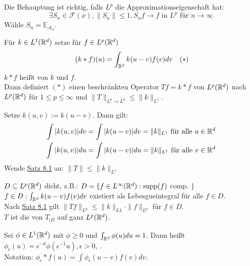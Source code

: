 \begin{beweis}
	Die Behauptung ist richtig, falls $L^{p}$ die Approximationseigenschaft hat:
	\[ \exists S_{n} \in \mathcal{F}(x), \| S_{n} \| \leq 1, S_{n} f \rightarrow f \text{ in } L^{p} \text{ für } n \rightarrow \infty \]
	Wähle $S_{n} = \mathds{E}_{\mathcal{A}_{n}}$.
\end{beweis}


\begin{satz}[Young] \label{satz:8.5-Young}
	Für $k \in L^{1}(\mathbb{R}^{d})$ setze für $f \in L^{p}(\mathbb{R}^{d})$
	\[ (k \ast f) (u) = \int_{\MdR^{d}} k(u - v) f(v) dv \quad (*) \label{eq:8.5-Young} \]
	$k \ast f$ hei{\ss}t  von $k$ und $f$. \\
	Dann definiert \hyperref[eq:8.5-Young]{$(*)$} einen beschränkten Operator $T f = k \ast f$ von $L^{p}(\mathbb{R}^{d})$ nach $L^{p}(\mathbb{R}^{d})$ für $1 \leq p \leq \infty$ und $\|T\|_{L^{p} \rightarrow L^{p}} \leq \|k\|_{L^{1}}$.
\end{satz}

\begin{beweis}
	Setze $k(u, v) := k(u - v)$. Dann gilt:
	\begin{align*}
		\int |k(u, v)| dv & = \int | k(u - v) | dv = \| k \|_{L^{1}} \text{ für alle } u \in \mathbb{R}^{d} \\
			\int |k(u, v)| d u& = \int | k(u - v) | du = \| k \|_{L^{1}} \text{ für alle } v \in \mathbb{R}^{d} \\
	\end{align*}	
	Wende \hyperref[satz:8.1]{Satz 8.1} an: $\| T \| \leq \| k \|_{L^{1}}$
\end{beweis}


\begin{bemerkung*}
	$D \subseteq L^{p}(\mathbb{R}^{d})$ dicht, z.B.: $D = \{ f \in L^{\infty}(\mathbb{R}^{d}): \operatorname{supp}(f)$ comp. $\}$ %
	$f \in D: \int_{\mathbb{R}^{d}} k(u - v) f(v) dv$ existiert als Lebesgueintegral für alle $f \in D$. \\
	Nach \hyperref[satz:8.1]{Satz 8.1} gilt $\| T f \|_{L^{p}} \leq \| k \|_{L{1}} \cdot \| f \|_{L^{p}}$ für $f \in D$. \\
	$T$ ist die  von $T_{\big| D}$ auf ganz $L^{p}(\mathbb{R}^{d})$.
\end{bemerkung*}


\begin{definition}
	Sei $\phi \in L^{1}(\mathbb{R}^{d})$ mit $\phi \geq 0$ und $\int_{\mathbb{R}^{d}} \phi(u) du = 1$. Dann hei{\ss}t $\phi_{\epsilon}(u) = \epsilon^{-d} \phi(\epsilon^{-1} u), \epsilon > 0$,	. \\
	Notation: $\phi_{\epsilon} \ast f(u) = \int \phi_{\epsilon}(u - v) f(v) dv$.
\end{definition}


